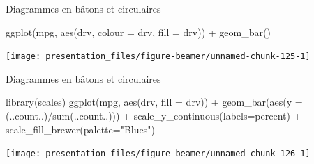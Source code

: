 \documentclass[12pt,ignorenonframetext,handout,]{beamer}
\newenvironment{Shaded}{}{}
\newcommand{\DataTypeTok}[1]{#1}
\newcommand{\KeywordTok}[1]{\textcolor[rgb]{0.00,0.00,1.00}{#1}}
\newcommand{\NormalTok}[1]{#1}
\newcommand{\OperatorTok}[1]{#1}
\newcommand{\StringTok}[1]{\textcolor[rgb]{0.00,0.50,0.50}{#1}}
\renewenvironment{Shaded}{\begin{snugshade}}{\end{snugshade}}
\begin{document}
\begin{frame}[fragile]{Diagrammes en bâtons et circulaires}
\protect\hypertarget{diagrammes-en-batons-et-circulaires-4}{}

\footnotesize \center

\begin{Shaded}
\begin{Highlighting}[]
\KeywordTok{ggplot}\NormalTok{(mpg, }\KeywordTok{aes}\NormalTok{(drv, }\DataTypeTok{colour =}\NormalTok{ drv, }\DataTypeTok{fill =}\NormalTok{ drv)) }\OperatorTok{+}\StringTok{ }
\StringTok{  }\KeywordTok{geom_bar}\NormalTok{()}
\end{Highlighting}
\end{Shaded}

\texttt{[image: presentation\_files/figure-beamer/unnamed-chunk-125-1]}

\end{frame}

\begin{frame}[fragile]{Diagrammes en bâtons et circulaires}
\protect\hypertarget{diagrammes-en-batons-et-circulaires-5}{}

\footnotesize \center

\begin{Shaded}
\begin{Highlighting}[]
\KeywordTok{library}\NormalTok{(scales)}
\KeywordTok{ggplot}\NormalTok{(mpg, }\KeywordTok{aes}\NormalTok{(drv, }\DataTypeTok{fill =}\NormalTok{ drv)) }\OperatorTok{+}\StringTok{ }
\StringTok{  }\KeywordTok{geom_bar}\NormalTok{(}\KeywordTok{aes}\NormalTok{(}\DataTypeTok{y =}\NormalTok{ (..count..)}\OperatorTok{/}\KeywordTok{sum}\NormalTok{(..count..))) }\OperatorTok{+}
\StringTok{  }\KeywordTok{scale_y_continuous}\NormalTok{(}\DataTypeTok{labels=}\NormalTok{percent) }\OperatorTok{+}
\StringTok{  }\KeywordTok{scale_fill_brewer}\NormalTok{(}\DataTypeTok{palette=}\StringTok{"Blues"}\NormalTok{)}
\end{Highlighting}
\end{Shaded}

\texttt{[image: presentation\_files/figure-beamer/unnamed-chunk-126-1]}

\end{frame}
\end{document}
